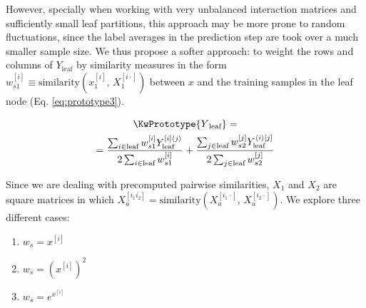 \documentclass[conference]{IEEEtran}
\newcommand{\el}[1]{^{[#1]}}
\newcommand{\angled}[1]{\langle #1 \rangle}
\begin{document}
However, specially when working with very unbalanced interaction matrices and sufficiently small leaf partitions, this approach may be more prone to random fluctuations, since the label averages in the prediction step are took over a much smaller sample size. We thus propose a softer approach: to weight the rows and columns of $Y_\text{leaf}$ by similarity measures in the form $w_{s1}\el i \equiv \text{similarity}(x_1\el i, \, X_1\el{i\cdot})$ between $x$ and the training samples in the leaf node (Eq. \ref{eq:prototype3}).

\begin{multline}
    \KwPrototype{Y\textsubscript{leaf}} =\\
    =\frac{
        \sum_{i\in \text{leaf}}
            w_{s1}\el i
            Y_\text{leaf}^{[i]\angled j}
    }{
        2\sum_{i\in \text{leaf}}
            w_{s1}\el i
    }
    +
    \frac{
        \sum_{j\in \text{leaf}}
            w_{s2}\el j
            Y_\text{leaf}^{\angled i[j]}
    }{
        2\sum_{j\in \text{leaf}}
            w_{s2}\el j
    }
    \label{eq:prototype3}
\end{multline}

Since we are dealing with precomputed pairwise similarities, $X_1$ and $X_2$ are square matrices in which $X_a\el{i_1i_2} = \text{similarity}(X_a\el{i_1\cdot},\, X_a \el{i_2\cdot})$. We explore three different cases:

\begin{enumerate}
    \item $w_s = x\el i$
    \item $w_s = (x\el i )^2$
    \item $w_s = e^{x\el i}$
\end{enumerate}
\end{document}
